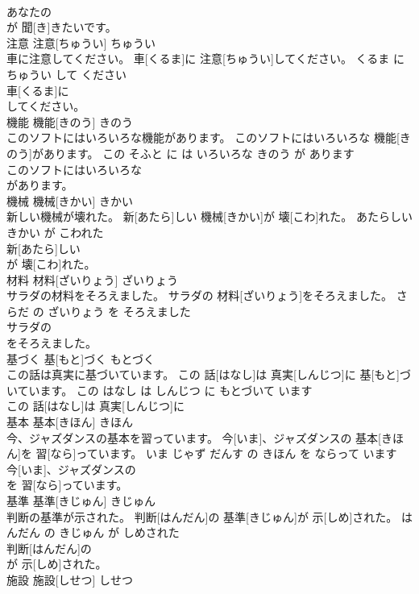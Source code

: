 \documentclass[8pt]{extreport}
\begin{document}
\begin{CJK}{UTF8}{min}
\\	あなたの
\\	が 聞[き]きたいです。			
\\	注意	注意[ちゅうい]	ちゅうい	
\\	車に注意してください。	車[くるま]に 注意[ちゅうい]してください。	くるま に ちゅうい して ください	
\\	車[くるま]に
\\	してください。			
\\	機能	機能[きのう]	きのう	
\\	このソフトにはいろいろな機能があります。	このソフトにはいろいろな 機能[きのう]があります。	この そふと に は いろいろな きのう が あります	
\\	このソフトにはいろいろな
\\	があります。			
\\	機械	機械[きかい]	きかい	
\\	新しい機械が壊れた。	新[あたら]しい 機械[きかい]が 壊[こわ]れた。	あたらしい きかい が こわれた	
\\	新[あたら]しい
\\	が 壊[こわ]れた。			
\\	材料	材料[ざいりょう]	ざいりょう	
\\	サラダの材料をそろえました。	サラダの 材料[ざいりょう]をそろえました。	さらだ の ざいりょう を そろえました	
\\	サラダの
\\	をそろえました。			
\\	基づく	基[もと]づく	もとづく	
\\	この話は真実に基づいています。	この 話[はなし]は 真実[しんじつ]に 基[もと]づいています。	この はなし は しんじつ に もとづいて います	
\\	この 話[はなし]は 真実[しんじつ]に
\\	基本	基本[きほん]	きほん	
\\	今、ジャズダンスの基本を習っています。	今[いま]、ジャズダンスの 基本[きほん]を 習[なら]っています。	いま じゃず だんす の きほん を ならって います	
\\	今[いま]、ジャズダンスの
\\	を 習[なら]っています。			
\\	基準	基準[きじゅん]	きじゅん	
\\	判断の基準が示された。	判断[はんだん]の 基準[きじゅん]が 示[しめ]された。	はんだん の きじゅん が しめされた	
\\	判断[はんだん]の
\\	が 示[しめ]された。			
\\	施設	施設[しせつ]	しせつ	

\end{CJK}
\end{document}
